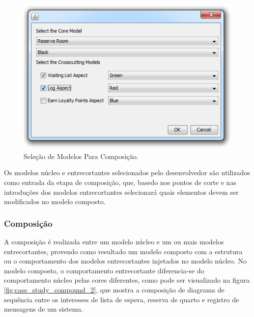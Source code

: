   \begin{figure}[!h]
	\centering
	\includegraphics{img/selection_screen.png}
	\caption{Seleção de Modelos Para Composição.}\label{fig:selection_screen}
  \end{figure}
  
Os modelos núcleo e entrecortantes selecionados pelo desenvolvedor são utilizados como entrada da etapa de composição, que, basedo nos pontos de corte
e nas introduções dos modelos entrecortantes selecionará quais elementos devem ser modificados no modelo composto.  

\subsubsection{Composição}

A composição é realizada entre um modelo núcleo e um ou mais modelos entrecortantes, provendo como resultado um modelo composto com a estrutura ou o
comportamento dos modelos entrecortantes injetados no modelo núcleo. No modelo composto, o comportamento entrecortante diferencia-se do comportamento
núcleo pelas cores diferentes, como pode ser visualizado na figura \ref{fig:case_study_compound_2}, que mostra a composição de diagrama de
sequência entre os interesses de lista de espera, reserva de quarto e registro de mensagens de um sistema.

